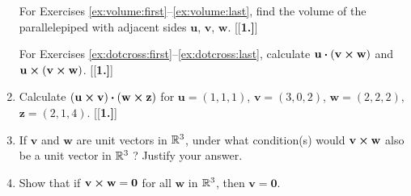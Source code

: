 \begin{enumerate}[\bfseries 1.]
\par\noindent For Exercises \ref{ex:volume:first}--\ref{ex:volume:last}, find the volume of the parallelepiped with adjacent sides $\mathbf{u}$,
$\mathbf{v}$, $\mathbf{w}$.
[{[\bfseries 1.]}]
\par\noindent For Exercises \ref{ex:dotcross:first}--\ref{ex:dotcross:last}, calculate $\mathbf{u} \bm{\cdot} (\mathbf{v} \bm{\times} \mathbf{w})$ and
$\mathbf{u} \bm{\times} (\mathbf{v} \bm{\times} \mathbf{w})$.
[{[\bfseries 1.]}]
 \item Calculate $(\mathbf{u} \bm{\times} \mathbf{v}) \bm{\cdot} (\mathbf{w} \bm{\times} \mathbf{z})$ for
 $\mathbf{u} = (1,1,1)$, $\mathbf{v} = (3,0,2)$, $\mathbf{w} = (2,2,2)$, $\mathbf{z} = (2,1,4)$.
[{[\bfseries 1.]}]
 \item If $\mathbf{v}$ and $\mathbf{w}$ are unit vectors in $\mathbb{R}^{3}$, under what condition(s) would
  $\mathbf{v} \bm{\times} \mathbf{w}$ also be a unit vector in $\mathbb{R}^{3}\;$? Justify your answer.
 \item Show that if $\mathbf{v} \bm{\times} \mathbf{w} = \mathbf{0}$ for all $\mathbf{w}$ in $\mathbb{R}^{3}$, then
  $\mathbf{v} = \mathbf{0}$.
\end{enumerate}
